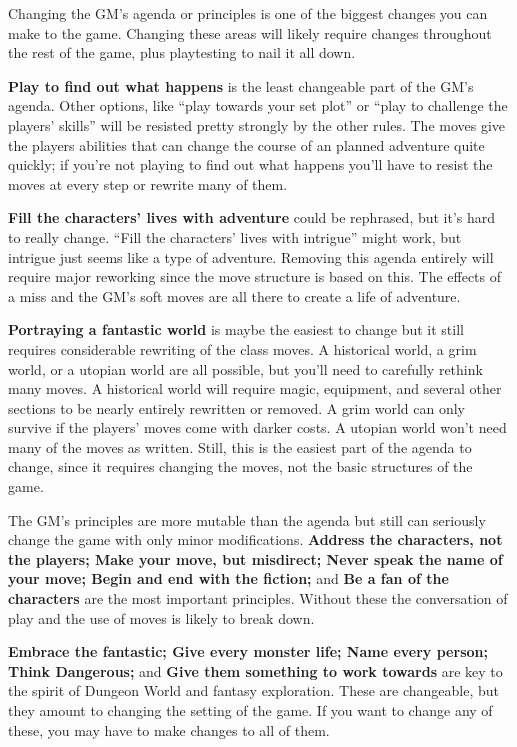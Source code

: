  Changing the GM's agenda or principles is one of the biggest changes you can make to the game. Changing these areas will likely require changes throughout the rest of the game, plus playtesting to nail it all down.


 \textbf{Play to find out what happens}
 is the least changeable part of the GM's agenda. Other options, like ``play towards your set plot'' or ``play to challenge the players' skills'' will be resisted pretty strongly by the other rules. The moves give the players abilities that can change the course of an planned adventure quite quickly; if you're not playing to find out what happens you'll have to resist the moves at every step or rewrite many of them.


 \textbf{Fill the characters' lives with adventure}
 could be rephrased, but it's hard to really change. ``Fill the characters' lives with intrigue'' might work, but intrigue just seems like a type of adventure. Removing this agenda entirely will require major reworking since the move structure is based on this. The effects of a miss and the GM's soft moves are all there to create a life of adventure.


 \textbf{Portraying a fantastic world}
 is maybe the easiest to change but it still requires considerable rewriting of the class moves. A historical world, a grim world, or a utopian world are all possible, but you'll need to carefully rethink many moves. A historical world will require magic, equipment, and several other sections to be nearly entirely rewritten or removed. A grim world can only survive if the players' moves come with darker costs. A utopian world won't need many of the moves as written. Still, this is the easiest part of the agenda to change, since it requires changing the moves, not the basic structures of the game.


 The GM's principles are more mutable than the agenda but still can seriously change the game with only minor modifications. \textbf{Address the characters, not the players; Make your move, but misdirect; Never speak the name of your move; Begin and end with the fiction;}
 and \textbf{Be a fan of the characters}
 are the most important principles. Without these the conversation of play and the use of moves is likely to break down.


 \textbf{Embrace the fantastic; Give every monster life; Name every person; Think Dangerous;}
 and \textbf{Give them something to work towards}
 are key to the spirit of Dungeon World and fantasy exploration. These are changeable, but they amount to changing the setting of the game. If you want to change any of these, you may have to make changes to all of them.


